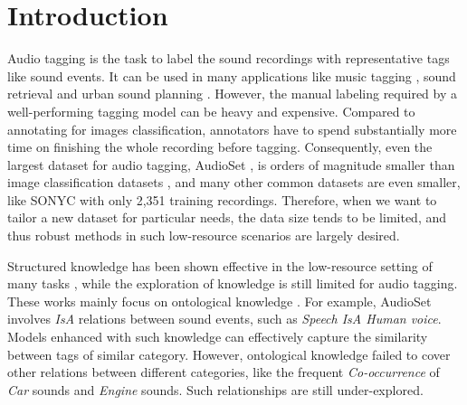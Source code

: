 \section{Introduction}
\label{sec:intro}

Audio tagging is the task to label the sound recordings with representative tags like sound events. It can be used in many applications like music tagging \citep{fu2010survey}, sound retrieval \citep{font2018sound} and urban sound planning \citep{bello2019sonyc}. However, the manual labeling required by a well-performing tagging model can be heavy and expensive. Compared to annotating for images classification, annotators have to spend substantially more time on finishing the whole recording before tagging. Consequently, even the largest dataset for audio tagging, AudioSet \citep{gemmeke2017audio}, is orders of magnitude smaller than image classification datasets \citep{deng2009imagenet, thomee2016yfcc100m}, and many other common datasets are even smaller, like SONYC \citep{bello2019sonyc} with only 2,351 training recordings. Therefore, when we want to tailor a new dataset for particular needs, the data size tends to be limited, and thus robust methods in such low-resource scenarios are largely desired.

Structured knowledge has been shown effective in the low-resource setting of many tasks \citep{shwartz2020unsupervised, feng2020scalable, ji2020language, li2013data, zhang2013automatic}, while the exploration of knowledge is still limited for audio tagging. These works mainly focus on ontological knowledge \citep{jati2019hierarchy, sun2020ontology, shrivaslava2020mt}. For example, AudioSet involves \textit{IsA} relations between sound events, such as \textit{Speech IsA Human voice}. Models enhanced with such knowledge can effectively capture the similarity between tags of similar category. However, ontological knowledge failed to cover other relations between different categories, like the frequent \textit{Co-occurrence} of \textit{Car} sounds and \textit{Engine} sounds. Such relationships are still under-explored.

